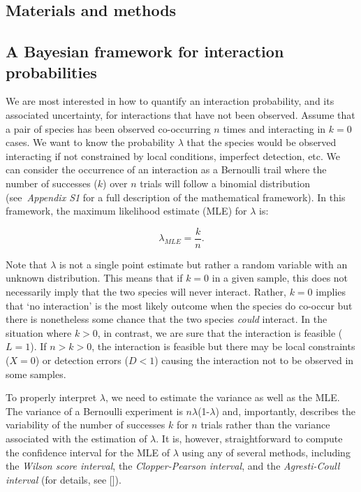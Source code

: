 \documentclass[12pt]{article}
\begin{document}
\begin{spacing}{2.0}
\section*{Materials and methods}

  \subsection*{A Bayesian framework for interaction probabilities}

    We are most interested in how to quantify an interaction probability, and its associated uncertainty, for interactions that have not been observed. Assume that a pair of species has been observed co-occurring $n$ times and interacting in $k = 0$ cases. We want to know the probability $\lambda$ that the species would be observed interacting if not constrained by local conditions, imperfect detection, etc. We can consider the occurrence of an interaction as a Bernoulli trail where the number of successes ($k$) over $n$ trials will follow a binomial distribution (see~\emph{Appendix S1} for a full description of the mathematical framework). In this framework, the maximum likelihood estimate (MLE) for $\lambda$ is:

        \begin{equation}
          \lambda_{MLE} = \frac{k}{n}  .
          \label{theta_MLE}
        \end{equation}
  

    Note that $\lambda$ is not a single point estimate but rather a random variable with an unknown distribution. This means that if $k = 0$ in a given sample, this does not necessarily imply that the two species will never interact. Rather, $k = 0$ implies that `no interaction' is the most likely outcome when the species do co-occur but there is nonetheless some chance that the two species \emph{could} interact. In the situation where $k>0$, in contrast, we are sure that the interaction is feasible ($L = 1$). If $n>k>0$, the interaction is feasible but there may be local constraints ($X = 0$) or detection errors ($D<1$) causing the interaction not to be observed in some samples. 


    To properly interpret $\lambda$, we need to estimate the variance as well as the MLE. The variance of a Bernoulli experiment is $n\lambda$(1-$\lambda$) and, importantly, describes the variability of the number of successes $k$ for $n$ trials rather than the variance associated with the estimation of $\lambda$. It is, however, straightforward to compute the confidence interval for the MLE of $\lambda$ using any of several methods, including the \emph{Wilson score interval}, the \emph{Clopper-Pearson interval}, and the \emph{Agresti-Coull interval} (for details, see [\citealp{Brown2001}]). 



\end{spacing}
\end{document}
